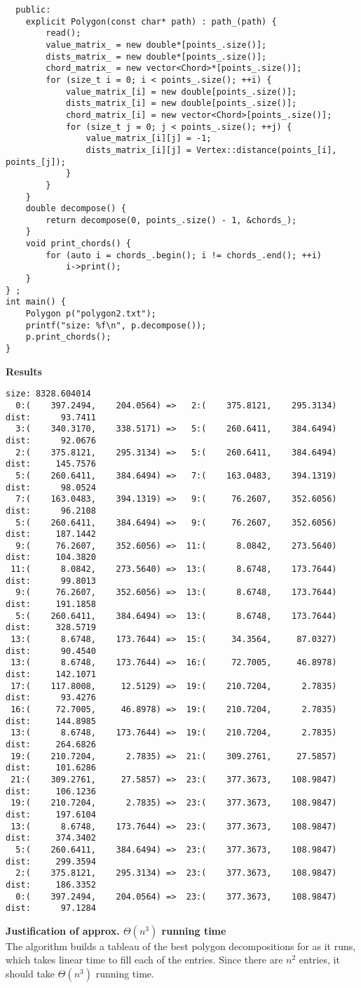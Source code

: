 \documentclass{article}%
\begin{document}
\begin{verbatim}
  public:
    explicit Polygon(const char* path) : path_(path) {
        read();
        value_matrix_ = new double*[points_.size()];
        dists_matrix_ = new double*[points_.size()];
        chord_matrix_ = new vector<Chord>*[points_.size()];
        for (size_t i = 0; i < points_.size(); ++i) {
            value_matrix_[i] = new double[points_.size()];
            dists_matrix_[i] = new double[points_.size()];
            chord_matrix_[i] = new vector<Chord>[points_.size()];
            for (size_t j = 0; j < points_.size(); ++j) {
                value_matrix_[i][j] = -1;
                dists_matrix_[i][j] = Vertex::distance(points_[i], points_[j]);
            }
        }
    }
    double decompose() {
        return decompose(0, points_.size() - 1, &chords_);
    }
    void print_chords() {
        for (auto i = chords_.begin(); i != chords_.end(); ++i)
            i->print();
    }
} ;
int main() {
    Polygon p("polygon2.txt");
    printf("size: %f\n", p.decompose());
    p.print_chords();
}

\end{verbatim}

\textbf{Results}

\begin{verbatim}
size: 8328.604014
  0:(    397.2494,    204.0564) =>   2:(    375.8121,    295.3134) dist:      93.7411
  3:(    340.3170,    338.5171) =>   5:(    260.6411,    384.6494) dist:      92.0676
  2:(    375.8121,    295.3134) =>   5:(    260.6411,    384.6494) dist:     145.7576
  5:(    260.6411,    384.6494) =>   7:(    163.0483,    394.1319) dist:      98.0524
  7:(    163.0483,    394.1319) =>   9:(     76.2607,    352.6056) dist:      96.2108
  5:(    260.6411,    384.6494) =>   9:(     76.2607,    352.6056) dist:     187.1442
  9:(     76.2607,    352.6056) =>  11:(      8.0842,    273.5640) dist:     104.3820
 11:(      8.0842,    273.5640) =>  13:(      8.6748,    173.7644) dist:      99.8013
  9:(     76.2607,    352.6056) =>  13:(      8.6748,    173.7644) dist:     191.1858
  5:(    260.6411,    384.6494) =>  13:(      8.6748,    173.7644) dist:     328.5719
 13:(      8.6748,    173.7644) =>  15:(     34.3564,     87.0327) dist:      90.4540
 13:(      8.6748,    173.7644) =>  16:(     72.7005,     46.8978) dist:     142.1071
 17:(    117.8008,     12.5129) =>  19:(    210.7204,      2.7835) dist:      93.4276
 16:(     72.7005,     46.8978) =>  19:(    210.7204,      2.7835) dist:     144.8985
 13:(      8.6748,    173.7644) =>  19:(    210.7204,      2.7835) dist:     264.6826
 19:(    210.7204,      2.7835) =>  21:(    309.2761,     27.5857) dist:     101.6286
 21:(    309.2761,     27.5857) =>  23:(    377.3673,    108.9847) dist:     106.1236
 19:(    210.7204,      2.7835) =>  23:(    377.3673,    108.9847) dist:     197.6104
 13:(      8.6748,    173.7644) =>  23:(    377.3673,    108.9847) dist:     374.3402
  5:(    260.6411,    384.6494) =>  23:(    377.3673,    108.9847) dist:     299.3594
  2:(    375.8121,    295.3134) =>  23:(    377.3673,    108.9847) dist:     186.3352
  0:(    397.2494,    204.0564) =>  23:(    377.3673,    108.9847) dist:      97.1284
\end{verbatim}

\textbf{Justification of approx. $\Theta(n^3)$ running time}\\

The algorithm builds a tableau of the best polygon decompositions for as it runs, which takes linear time to fill each of the entries. Since there are $n^2$ entries, it should take $\Theta(n^3)$ running time.
\end{document}
